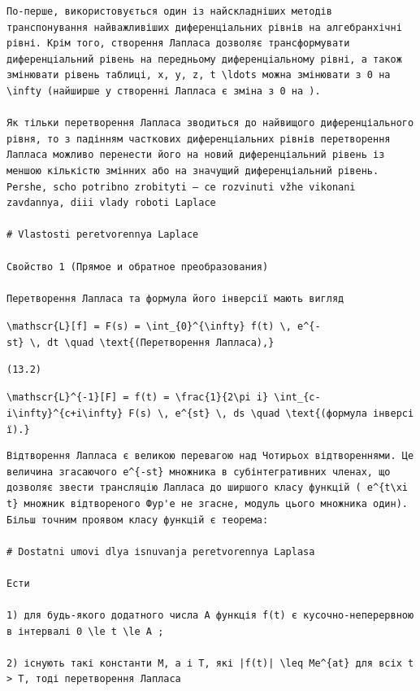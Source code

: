 \documentclass[
  ukrainian,
]{article}
\begin{document}
\begin{verbatim}
По-перше, використовується один із найскладніших методів транспонування найважливіших диференціальних рівнів на алгебранхічні рівні. Крім того, створення Лапласа дозволяє трансформувати диференціальний рівень на передньому диференціальному рівні, а також змінювати рівень таблиці, x, y, z, t \ldots можна змінювати з 0 на \infty (найширше у створенні Лапласа є зміна з 0 на ).

Як тільки перетворення Лапласа зводиться до найвищого диференціального рівня, то з падінням часткових диференціальних рівнів перетворення Лапласа можливо перенести його на новий диференціальний рівень із меншою кількістю змінних або на значущий диференціальний рівень. Pershe, scho potribno zrobityti — ce rozvinuti vžhe vikonani zavdannya, diii vlady roboti Laplace

# Vlastosti peretvorennya Laplace

Свойство 1 (Прямое и обратное преобразования)

Перетворення Лапласа та формула його інверсії мають вигляд
\end{verbatim}

\texttt{\textbackslash{}mathscr\{L\}{[}f{]}\ =\ F(s)\ =\ \textbackslash{}int\_\{0\}\^{}\{\textbackslash{}infty\}\ f(t)\ \textbackslash{},\ e\^{}\{-st\}\ \textbackslash{},\ dt\ \textbackslash{}quad\ \textbackslash{}text\{(Перетворення\ Лапласа),\}}

\begin{verbatim}
(13.2)
\end{verbatim}

\texttt{\textbackslash{}mathscr\{L\}\^{}\{-1\}{[}F{]}\ =\ f(t)\ =\ \textbackslash{}frac\{1\}\{2\textbackslash{}pi\ i\}\ \textbackslash{}int\_\{c-i\textbackslash{}infty\}\^{}\{c+i\textbackslash{}infty\}\ F(s)\ \textbackslash{},\ e\^{}\{st\}\ \textbackslash{},\ ds\ \textbackslash{}quad\ \textbackslash{}text\{(формула\ інверсії).\}}

\begin{verbatim}
Відтворення Лапласа є великою перевагою над Чотирьох відтвореннями. Це величина згасаючого e^{-st} множника в субінтегративних членах, що дозволяє звести трансляцію Лапласа до ширшого класу функцій ( e^{t\xi t} множник відтвореного Фур'е не згасне, модуль цього множника один). Більш точним проявом класу функцій є теорема:

# Dostatni umovi dlya іsnuvanja peretvorennya Laplasa

Ести

1) для будь-якого додатного числа A функція f(t) є кусочно-неперервною в інтервалі 0 \le t \le A ;

2) існують такі константи M, a і T, які |f(t)| \leq Me^{at} для всіх t > T, тоді перетворення Лапласа
\end{verbatim}
\end{document}

